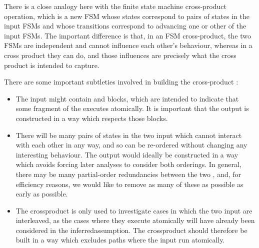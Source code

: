There is a close analogy here with the finite state machine
cross-product operation, which is a new FSM whose states correspond to
pairs of states in the input FSMs and whose transitions correspond to
advancing one or other of the input FSMs.  The important difference is
that, in an FSM cross-product, the two FSMs are independent and cannot
influence each other's behaviour, whereas in a {\StateMachine} cross
product they can do, and those influences are precisely what the cross
product is intended to capture.

There are some important subtleties involved in building the
cross-product {\StateMachine}:

\begin{itemize}
\item The input {\StateMachines} might contain {\stStartAtomic} and
  {\stEndAtomic} blocks, which are intended to indicate that some
  fragment of the {\StateMachine} executes atomically.  It is
  important that the output {\StateMachine} is constructed in a way
  which respects those blocks.
\item There will be many pairs of states in the two input
  {\StateMachines} which cannot interact with each other in any way,
  and so can be re-ordered without changing any interesting behaviour.
  The output {\StateMachine} would ideally be constructed in a way
  which avoids forcing later analyses to consider both orderings.  In
  general, there may be many partial-order redundancies\cite{Alur1997}
  between the two {\StateMachines}, and, for efficiency reasons, we
  would like to remove as many of these as possible as early as
  possible.
\item The \gls{crossproduct} {\StateMachine} is only used to
  investigate cases in which the two input {\StateMachines} are
  interleaved, as the cases where they execute atomically will have
  already been considered in the \gls{inferredassumption}.  The
  \gls{crossproduct} {\StateMachine} should therefore be built in a
  way which excludes paths where the input {\StateMachines} run
  atomically.
\end{itemize}

